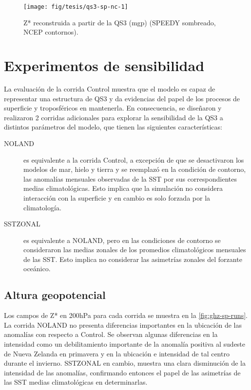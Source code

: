 \documentclass[spanish,a4paper,12pt,oneside]{book}
\begin{document}
\begin{figure}
\texttt{[image: fig/tesis/qs3-sp-nc-1]} \caption{Z* reconstruida a partir de la QS3 (mgp) (SPEEDY sombreado, NCEP contornos).}\label{fig:qs3-sp-nc}
\end{figure}

\section{Experimentos de
sensibilidad}\label{experimentos-de-sensibilidad}

La evaluación de la corrida Control muestra que el modelo es capaz de
representar una estructura de QS3 y da evidencias del papel de los
procesos de superficie y troposféricos en mantenerla. En consecuencia,
se diseñaron y realizaron 2 corridas adicionales para explorar la
sensibilidad de la QS3 a distintos parámetros del modelo, que tienen las
siguientes características:

\begin{description}

\item[NOLAND]
 es equivalente a la corrida Control, a excepción de que se desactivaron los modelos de mar, hielo y tierra y se reemplazó en la condición de contorno, las anomalías mensuales observadas de la SST por sus correspondientes medias climatológicas. Esto implica que la simulación no considera interacción con la superficie y en cambio es solo forzada por la climatología.
 
\item[SSTZONAL]

 es equivalente a NOLAND, pero en las condiciones de contorno se consideraron las medias zonales de los promedios climatológicos mensuales de las SST. Esto implica no considerar las asimetrías zonales del forzante oceánico.

\end{description}

\subsection{Altura geopotencial}\label{altura-geopotencial-2}

Los campos de Z* en 200hPa para cada corrida se muestra en la
\autoref{fig:ghz-sp-runs}. La corrida NOLAND no presenta diferencias
importantes en la ubicación de las anomalías con respecto a Control. Se
observan algunas diferencias en la intensidad como un debilitamiento
importante de la anomalía positiva al sudeste de Nueva Zelanda en
primavera y en la ubicación e intensidad de tal centro durante el
invierno. SSTZONAL en cambio, muestra una clara disminución de la
intensidad de las anomalías, confirmando entonces el papel de las
asimetrías de las SST medias climatológicas en determinarlas.
\end{document}
